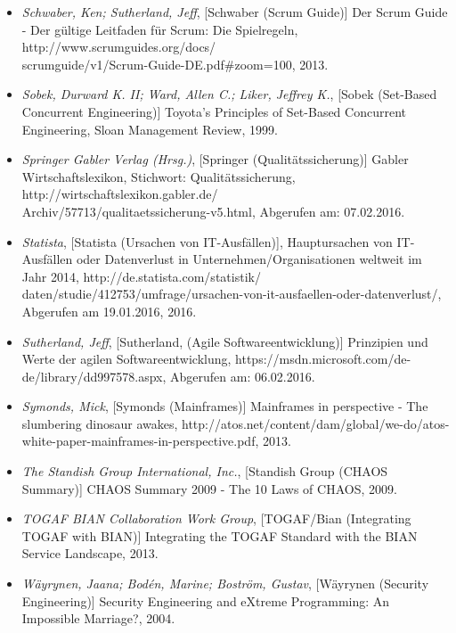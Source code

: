 \begin{itemize}
    \item[] \emph{Schwaber, Ken; Sutherland, Jeff}, [Schwaber (Scrum Guide)] Der Scrum Guide - Der gültige Leitfaden für Scrum: Die Spielregeln, http://www.scrumguides.org/docs/\\scrumguide/v1/Scrum-Guide-DE.pdf\#zoom=100,  2013.

    \item[] \emph{Sobek, Durward K. II; Ward, Allen C.; Liker, Jeffrey K.}, [Sobek (Set-Based Concurrent Engineering)] Toyota's Principles of Set-Based Concurrent Engineering, Sloan Management Review, 1999.

    \item[] \emph{Springer Gabler Verlag (Hrsg.)}, [Springer (Qualitätssicherung)] Gabler Wirtschaftslexikon, Stichwort: Qualitätssicherung, http://wirtschaftslexikon.gabler.de/\\Archiv/57713/qualitaetssicherung-v5.html, Abgerufen am: 07.02.2016.

    \item[] \emph{Statista}, [Statista (Ursachen von IT-Ausfällen)], Hauptursachen von IT-Ausfällen oder Datenverlust in Unternehmen/Organisationen weltweit im Jahr 2014, http://de.statista.com/statistik/\\daten/studie/412753/umfrage/ursachen-von-it-ausfaellen-oder-datenverlust/, Abgerufen am 19.01.2016, 2016.

    \item[] \emph{Sutherland, Jeff}, [Sutherland, (Agile Softwareentwicklung)] Prinzipien und Werte der agilen Softwareentwicklung, https://msdn.microsoft.com/de-de/library/dd997578.aspx, Abgerufen am: 06.02.2016.

    \item[] \emph{Symonds, Mick}, [Symonds (Mainframes)] Mainframes in perspective - The slumbering dinosaur awakes, http://atos.net/content/dam/global/we-do/atos-white-paper-mainframes-in-perspective.pdf, 2013.

    \item[] \emph{The Standish Group International, Inc.}, [Standish Group (CHAOS Summary)] CHAOS Summary 2009 - The 10 Laws of CHAOS, 2009.

    \item[] \emph{TOGAF BIAN Collaboration Work Group}, [TOGAF/Bian (Integrating TOGAF with BIAN)] Integrating the TOGAF Standard with the BIAN Service Landscape, 2013.

    \item[] \emph{Wäyrynen, Jaana; Bodén, Marine; Boström, Gustav}, [Wäyrynen (Security Engineering)] Security Engineering and eXtreme Programming: An Impossible Marriage?, 2004.


\end{itemize}

